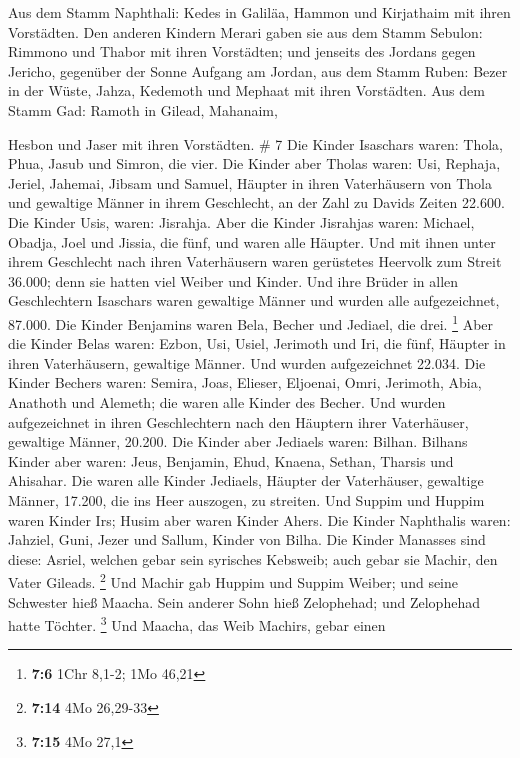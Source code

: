  Aus dem Stamm Naphthali: Kedes in Galiläa, Hammon und
Kirjathaim mit ihren Vorstädten.  Den anderen Kindern
Merari gaben sie aus dem Stamm Sebulon: Rimmono und Thabor mit ihren
Vorstädten;  und jenseits des Jordans gegen Jericho,
gegenüber der Sonne Aufgang am Jordan, aus dem Stamm Ruben: Bezer in der
Wüste, Jahza,  Kedemoth und Mephaat mit ihren Vorstädten.
 Aus dem Stamm Gad: Ramoth in Gilead, Mahanaim,

 Hesbon und Jaser mit ihren Vorstädten. \# 7 
Die Kinder Isaschars waren: Thola, Phua, Jasub und Simron, die vier.
 Die Kinder aber Tholas waren: Usi, Rephaja, Jeriel,
Jahemai, Jibsam und Samuel, Häupter in ihren Vaterhäusern von Thola und
gewaltige Männer in ihrem Geschlecht, an der Zahl zu Davids Zeiten
22.600.  Die Kinder Usis, waren: Jisrahja. Aber die Kinder
Jisrahjas waren: Michael, Obadja, Joel und Jissia, die fünf, und waren
alle Häupter.  Und mit ihnen unter ihrem Geschlecht nach
ihren Vaterhäusern waren gerüstetes Heervolk zum Streit 36.000; denn sie
hatten viel Weiber und Kinder.  Und ihre Brüder in allen
Geschlechtern Isaschars waren gewaltige Männer und wurden alle
aufgezeichnet, 87.000.  Die Kinder Benjamins waren Bela,
Becher und Jediael, die drei. \footnote{\textbf{7:6} 1Chr 8,1-2; 1Mo
  46,21}  Aber die Kinder Belas waren: Ezbon, Usi, Usiel,
Jerimoth und Iri, die fünf, Häupter in ihren Vaterhäusern, gewaltige
Männer. Und wurden aufgezeichnet 22.034.  Die Kinder Bechers
waren: Semira, Joas, Elieser, Eljoenai, Omri, Jerimoth, Abia, Anathoth
und Alemeth; die waren alle Kinder des Becher.  Und wurden
aufgezeichnet in ihren Geschlechtern nach den Häuptern ihrer
Vaterhäuser, gewaltige Männer, 20.200.  Die Kinder aber
Jediaels waren: Bilhan. Bilhans Kinder aber waren: Jeus, Benjamin, Ehud,
Knaena, Sethan, Tharsis und Ahisahar.  Die waren alle
Kinder Jediaels, Häupter der Vaterhäuser, gewaltige Männer, 17.200, die
ins Heer auszogen, zu streiten.  Und Suppim und Huppim
waren Kinder Irs; Husim aber waren Kinder Ahers.  Die
Kinder Naphthalis waren: Jahziel, Guni, Jezer und Sallum, Kinder von
Bilha.  Die Kinder Manasses sind diese: Asriel, welchen
gebar sein syrisches Kebsweib; auch gebar sie Machir, den Vater Gileads.
\footnote{\textbf{7:14} 4Mo 26,29-33}  Und Machir gab
Huppim und Suppim Weiber; und seine Schwester hieß Maacha. Sein anderer
Sohn hieß Zelophehad; und Zelophehad hatte Töchter. \footnote{\textbf{7:15}
  4Mo 27,1}  Und Maacha, das Weib Machirs, gebar einen
